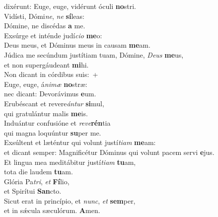 \evenverse dixérunt: Euge, euge, vidérunt óculi \textbf{no}stri.\\
\oddverse Vidísti, Dómi\textit{ne}, \textit{ne} \textbf{sí}leas:~\*\\
\oddverse Dómine, ne discédas \textbf{a} me.\\
\evenverse Exsúrge et inténde judí\textit{ci}\textit{o} \textbf{me}o:~\*\\
\evenverse Deus meus, et Dóminus meus in causam \textbf{me}am.\\
\oddverse Júdica me secúndum justítiam tuam, Dómine, \textit{De}\textit{us} \textbf{me}us,~\*\\
\oddverse et non supergáudeant \textbf{mi}hi.\\
\evenverse Non dicant in córdibus suis:~+\\
\evenverse  Euge, euge, á\textit{ni}\textit{mæ} \textbf{no}stræ:~\*\\
\evenverse nec dicant: Devorávimus \textbf{e}um.\\
\oddverse Erubéscant et revere\textit{án}\textit{tur} \textbf{si}mul,~\*\\
\oddverse qui gratulántur malis \textbf{me}is.\\
\evenverse Induántur confusióne et \textit{re}\textit{ve}\textbf{rén}tia~\*\\
\evenverse qui magna loquúntur \textbf{su}per me.\\
\oddverse Exsúltent et læténtur qui volunt justí\textit{ti}\textit{am} \textbf{me}am:~\*\\
\oddverse et dicant semper: Magnificétur Dóminus qui volunt pacem servi \textbf{e}jus.\\
\evenverse Et lingua mea meditábitur justí\textit{ti}\textit{am} \textbf{tu}am,~\*\\
\evenverse tota die laudem \textbf{tu}am.\\
\oddverse Glória Pa\textit{tri}, \textit{et} \textbf{Fí}lio,~\*\\
\oddverse et Spirítui \textbf{San}cto.\\
\evenverse Sicut erat in princípio, et \textit{nunc}, \textit{et} \textbf{sem}per,~\*\\
\evenverse et in sǽcula sæculórum. \textbf{A}men.\\
